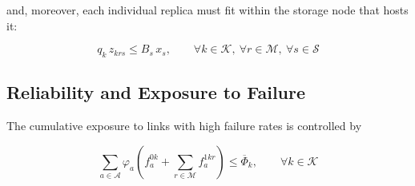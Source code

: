 \documentclass[a4paper,fleqn]{cas-dc}
\newcommand{\A}{\mathcal{A}}
\newcommand{\Iset}{\mathcal{I}}
\newcommand{\Dset}{\mathcal{D}}
\newcommand{\Eset}{\mathcal{E}}
\newcommand{\Sset}{\mathcal{S}}
\newcommand{\Kset}{\mathcal{K}}
\newcommand{\Mset}{\mathcal{M}}
\begin{document}
and, moreover, each individual replica must fit within the storage node that hosts it:

\begin{equation}
q_k\,z_{krs} \le B_s\,x_s,
\qquad \forall k\in\Kset,\ \forall r\in\Mset,\ \forall s\in\Sset
\end{equation}


\subsection*{Reliability and Exposure to Failure}


The cumulative exposure to links with high failure rates is controlled by

\begin{equation}
\sum_{a\in\A} \varphi_a\left(f_a^{0k} + \sum_{r\in\Mset} f_a^{1kr}\right)
\le \overline\Phi_k,
\qquad \forall k\in\Kset
\end{equation}

\end{document}
